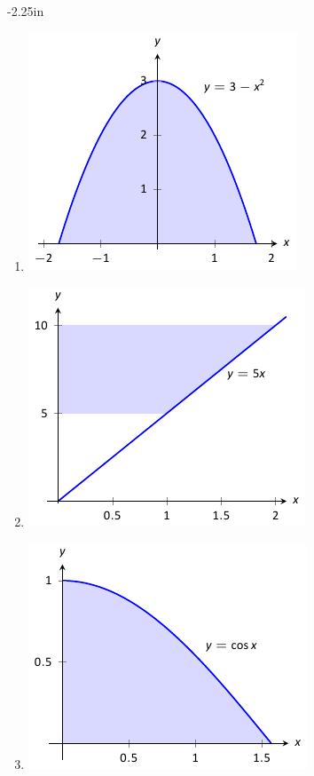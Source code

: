\begin{adjustwidth*}{}{-2.25in}
\begin{multicols*}{2}
\begin{enumerate}[1),resume]
\item \begin{minipage}{\linewidth}\centering\includegraphics{figures/fig07_02_ex_05}\end{minipage}
\item \begin{minipage}{\linewidth}\centering\includegraphics{figures/fig07_02_ex_10}\end{minipage}
\item \begin{minipage}{\linewidth}\centering\includegraphics{figures/fig07_02_ex_07}\end{minipage}
\end{enumerate}

\end{multicols*}
\end{adjustwidth*}

